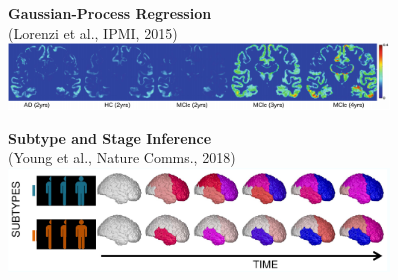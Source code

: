 \documentclass[8pt,xcolor=table]{beamer}
\begin{document}
\begin{frame}
\begin{small}
\begin{figure}[h]
  \vspace{2em}
  \begin{minipage}[t][\mnpHeight][t]{0.49\linewidth}
    \centering
    \textbf{Gaussian-Process Regression}\\ \footnotesize{(Lorenzi et al., IPMI, 2015)}
    \includegraphics[width=0.9\textwidth,trim=0 0 0 0, clip]{lorenzi_ipmi2015}
    
    \vspace{2em}
    
  \end{minipage}
  \begin{minipage}[t][\mnpHeight][t]{0.49\linewidth}
    \centering
    \textbf{Subtype and Stage Inference}\\ \footnotesize{(Young et al., Nature Comms., 2018)}
    \includegraphics[width=0.9\textwidth]{sustain}
  \end{minipage}


  \end{figure}
  \end{small}
  
  \vspace{-2em}
  


\end{frame}
\end{document}
